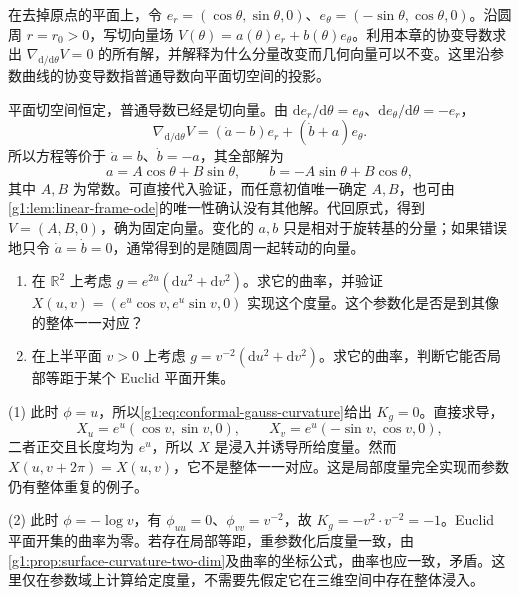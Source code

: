 \begin{exercise}\label{g1:ex:polar-parallel-vector}
	在去掉原点的平面上，令 \(e_r=(\cos\theta,\sin\theta,0)\)、\(e_\theta=(-\sin\theta,\cos\theta,0)\)。沿圆周 \(r=r_0>0\)，写切向量场 \(V(\theta)=a(\theta)e_r+b(\theta)e_\theta\)。利用本章的协变导数求出 \(\nabla_{\mathrm d/\mathrm d\theta}V=0\) 的所有解，并解释为什么分量改变而几何向量可以不变。这里沿参数曲线的协变导数指普通导数向平面切空间的投影。
\end{exercise}
\begin{solution}
	平面切空间恒定，普通导数已经是切向量。由 \(\mathrm de_r/\mathrm d\theta=e_\theta\)、\(\mathrm de_\theta/\mathrm d\theta=-e_r\)，
	\[
		\nabla_{\mathrm d/\mathrm d\theta}V
		=(\dot a-b)e_r+(\dot b+a)e_\theta.
	\]
	所以方程等价于 \(\dot a=b\)、\(\dot b=-a\)，其全部解为
	\[
		a=A\cos\theta+B\sin\theta,\qquad
		b=-A\sin\theta+B\cos\theta,
	\]
	其中 \(A,B\) 为常数。可直接代入验证，而任意初值唯一确定 \(A,B\)，也可由\cref{g1:lem:linear-frame-ode}的唯一性确认没有其他解。代回原式，得到 \(V=(A,B,0)\)，确为固定向量。变化的 \(a,b\) 只是相对于旋转基的分量；如果错误地只令 \(\dot a=\dot b=0\)，通常得到的是随圆周一起转动的向量。
\end{solution}

\begin{exercise}\label{g1:ex:two-conformal-metrics}
	\begin{enumerate}
		\item 在 \(\mathbb R^2\) 上考虑 \(g=e^{2u}(\mathrm du^2+\mathrm dv^2)\)。求它的曲率，并验证 \(X(u,v)=(e^u\cos v,e^u\sin v,0)\) 实现这个度量。这个参数化是否是到其像的整体一一对应？
		\item 在上半平面 \(v>0\) 上考虑 \(g=v^{-2}(\mathrm du^2+\mathrm dv^2)\)。求它的曲率，判断它能否局部等距于某个 Euclid 平面开集。
	\end{enumerate}
\end{exercise}
\begin{solution}
	(1) 此时 \(\phi=u\)，所以\eqref{g1:eq:conformal-gauss-curvature}给出 \(K_g=0\)。直接求导，
	\[
		X_u=e^u(\cos v,\sin v,0),\qquad
		X_v=e^u(-\sin v,\cos v,0),
	\]
	二者正交且长度均为 \(e^u\)，所以 \(X\) 是浸入并诱导所给度量。然而 \(X(u,v+2\pi)=X(u,v)\)，它不是整体一一对应。这是局部度量完全实现而参数仍有整体重复的例子。

	(2) 此时 \(\phi=-\log v\)，有 \(\phi_{uu}=0\)、\(\phi_{vv}=v^{-2}\)，故 \(K_g=-v^2\cdot v^{-2}=-1\)。Euclid 平面开集的曲率为零。若存在局部等距，重参数化后度量一致，由\cref{g1:prop:surface-curvature-two-dim}及曲率的坐标公式，曲率也应一致，矛盾。这里仅在参数域上计算给定度量，不需要先假定它在三维空间中存在整体浸入。
\end{solution}

